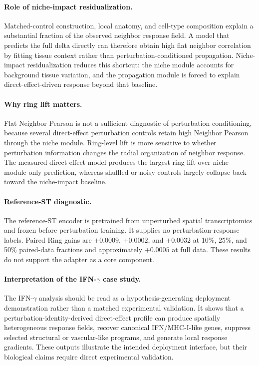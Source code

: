 \documentclass[sigconf,review,balance=false]{acmart}
\begin{document}
\paragraph{Role of niche-impact residualization.}
Matched-control construction, local anatomy, and cell-type composition explain a substantial fraction of the observed neighbor response field. A model that predicts the full delta directly can therefore obtain high flat neighbor correlation by fitting tissue context rather than perturbation-conditioned propagation. Niche-impact residualization reduces this shortcut: the niche module accounts for background tissue variation, and the propagation module is forced to explain direct-effect-driven response beyond that baseline.

\paragraph{Why ring lift matters.}
Flat Neighbor Pearson is not a sufficient diagnostic of perturbation conditioning, because several direct-effect perturbation controls retain high Neighbor Pearson through the niche module. Ring-level lift is more sensitive to whether perturbation information changes the radial organization of neighbor response. The measured direct-effect model produces the largest ring lift over niche-module-only prediction, whereas shuffled or noisy controls largely collapse back toward the niche-impact baseline.

\paragraph{Reference-ST diagnostic.}
The reference-ST encoder is pretrained from unperturbed spatial transcriptomics
and frozen before perturbation training. It supplies no perturbation-response
labels. Paired Ring gains are $+0.0009$, $+0.0002$, and $+0.0032$ at 10\%,
25\%, and 50\% paired-data fractions and approximately $+0.0005$ at full
data. These results do not support the adapter as a core component.

\paragraph{Interpretation of the IFN-$\gamma$ case study.}
The IFN-$\gamma$ analysis should be read as a hypothesis-generating deployment demonstration rather than a matched experimental validation. It shows that a perturbation-identity-derived direct-effect profile can produce spatially heterogeneous response fields, recover canonical IFN/MHC-I-like genes, suppress selected structural or vascular-like programs, and generate local response gradients. These outputs illustrate the intended deployment interface, but their biological claims require direct experimental validation.
\end{document}
